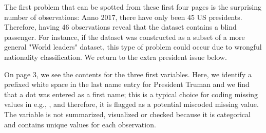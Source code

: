 \documentclass[article,shortnames]{jss}
\begin{document}
The first problem that can be spotted from these first four pages is the surprising number of observations: Anno 2017, there have only been 45 US presidents. Therefore, having 46 observations reveal that the dataset contains a blind passenger. For instance, if the dataset was constructed as a subset of a more general "World leaders" dataset, this type of problem could occur due to wrongful nationality classification. We return to the extra president issue below. 

On page 3, we see the contents for the three first variables. Here, we identify a prefixed white space in the last name entry for President Truman and we find that a dot was entered as a first name; this is a typical choice for coding missing values in e.g., , and therefore, it is flagged as a potential miscoded missing value. The variable  is not summarized, visualized or checked because it is categorical and contains unique values for each observation. 
\end{document}
